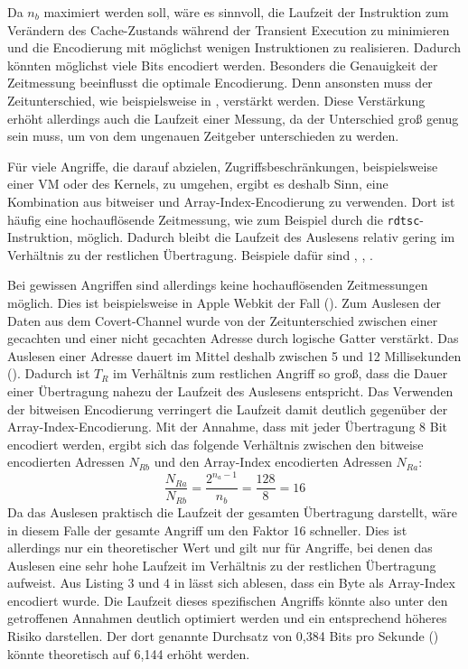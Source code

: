 Da $n_b$ maximiert werden soll, wäre es sinnvoll, die Laufzeit
der Instruktion zum Verändern des Cache-Zustands während der
Transient Execution zu minimieren und die Encodierung mit
möglichst wenigen Instruktionen zu realisieren. Dadurch könnten
möglichst viele Bits encodiert werden.
Besonders die Genauigkeit der Zeitmessung beeinflusst die
optimale Encodierung. Denn ansonsten muss der Zeitunterschied,
wie beispielsweise in \cite[17]{kim_slap_2025}, verstärkt werden.
Diese Verstärkung erhöht allerdings auch die Laufzeit einer
Messung, da der Unterschied groß genug sein muss, um von dem
ungenauen Zeitgeber unterschieden zu werden.

Für viele Angriffe, die darauf abzielen, Zugriffsbeschränkungen,
beispielsweise einer \ac{VM} oder des Kernels, zu umgehen, ergibt
es deshalb Sinn, eine Kombination aus bitweiser und Array-Index-Encodierung
zu verwenden. Dort ist häufig eine hochauflösende Zeitmessung,
wie zum Beispiel durch die \verb|rdtsc|-Instruktion, möglich.
Dadurch bleibt die Laufzeit des Auslesens relativ gering im
Verhältnis zu der restlichen Übertragung. Beispiele dafür sind
\cite{hertogh_rain_nodate}, \cite{lipp_meltdown_2020},
\cite{maisuradze_ret2spec_2018}.

Bei gewissen Angriffen sind allerdings keine hochauflösenden
Zeitmessungen möglich. Dies ist beispielsweise in Apple Webkit
der Fall (\cite[11]{kim_slap_2025}). Zum Auslesen der Daten aus
dem Covert-Channel wurde von \cite{kim_slap_2025} der
Zeitunterschied zwischen einer gecachten und einer nicht
gecachten Adresse durch logische Gatter verstärkt. Das Auslesen
einer Adresse dauert im Mittel deshalb zwischen 5 und 12
Millisekunden (\cite[17]{kim_slap_2025}). Dadurch ist $T_R$ im
Verhältnis zum restlichen Angriff so groß, dass die Dauer einer
Übertragung nahezu der Laufzeit des Auslesens entspricht.
Das Verwenden der bitweisen Encodierung verringert die Laufzeit
damit deutlich gegenüber der Array-Index-Encodierung. Mit der
Annahme, dass mit jeder Übertragung 8 Bit encodiert werden,
ergibt sich das folgende Verhältnis zwischen den bitweise
encodierten Adressen $N_{Rb}$ und den Array-Index encodierten
Adressen $N_{Ra}$:
\[\frac{N_{Ra}}{N_{Rb}}=\frac{2^{n_a-1}}{n_b}=\frac{128}{8}=16\]
Da das Auslesen praktisch die Laufzeit der gesamten Übertragung
darstellt, wäre in diesem Falle der gesamte Angriff um den Faktor
16 schneller. Dies ist allerdings nur ein theoretischer Wert
und gilt nur für Angriffe, bei denen das Auslesen eine sehr
hohe Laufzeit im Verhältnis zu der restlichen Übertragung
aufweist. Aus Listing 3 und 4 in \cite[6,8]{kim_slap_2025} lässt
sich ablesen, dass ein Byte als Array-Index encodiert wurde.
Die Laufzeit dieses spezifischen Angriffs könnte also unter den
getroffenen Annahmen deutlich optimiert werden und ein
entsprechend höheres Risiko darstellen. Der dort genannte
Durchsatz von 0,384 Bits pro Sekunde (\cite[12]{kim_slap_2025})
könnte theoretisch auf 6,144 erhöht werden.

